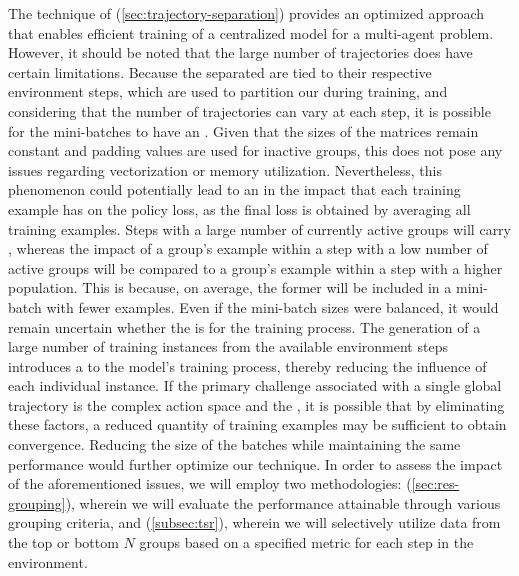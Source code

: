 \noindent The technique of  (\autoref{sec:trajectory-separation}) provides an optimized approach that enables efficient training of a centralized model for a multi-agent problem. However, it should be noted that the large number of trajectories does have certain limitations. Because the separated  are tied to their respective environment steps, which are used to partition our  during training, and considering that the number of trajectories can vary at each step, it is possible for the mini-batches to have an . Given that the sizes of the matrices remain constant and padding values are used for inactive groups, this does not pose any issues regarding vectorization or memory utilization. Nevertheless, this phenomenon could potentially lead to an  in the impact that each training example has on the policy loss, as the final loss is obtained by averaging all training examples. Steps with a large number of currently active groups will carry , whereas the impact of a group's example within a step with a low number of active groups will be  compared to a group's example within a step with a higher population. This is because, on average, the former will be included in a mini-batch with fewer examples. Even if the mini-batch sizes were balanced, it would remain uncertain whether the  is  for the training process. The generation of a large number of training instances from the available environment steps introduces a  to the model's training process, thereby reducing the influence of each individual instance. If the primary challenge associated with a single global trajectory is the complex action space and the , it is possible that by eliminating these factors, a reduced quantity of training examples may be sufficient to obtain convergence. Reducing the size of the batches while maintaining the same performance would further optimize our technique. In order to assess the impact of the aforementioned issues, we will employ two methodologies:  (\autoref{sec:res-grouping}), wherein we will evaluate the performance attainable through various grouping criteria, and  (\autoref{subsec:tsr}), wherein we will selectively utilize data from the top or bottom $N$ groups based on a specified metric for each step in the environment.

